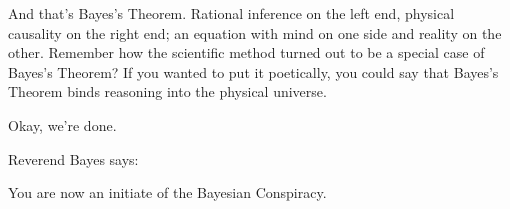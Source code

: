{
 And that's Bayes's Theorem.
Rational inference on the left end, physical causality on the right
end; an equation with mind on one side and reality on the other.
Remember how the scientific method turned out to be a special case of
Bayes's Theorem? If you wanted to put it poetically,
you could say that Bayes's Theorem binds reasoning into
the physical universe.}

{
 Okay, we're done.}

{\centering
 Reverend Bayes says:\newline
 
 \newline
 You are now an initiate of the Bayesian Conspiracy.
\par}


\bigskip

\myendsectiontext


\bigskip




